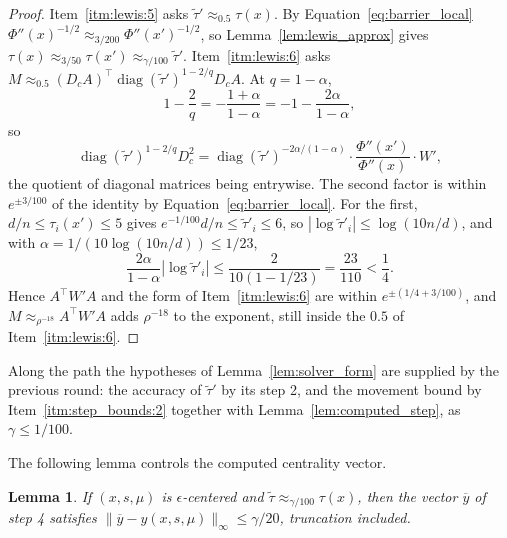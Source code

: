 \documentclass[11pt]{article}
\newtheorem{lemma}{Lemma}[section]
\newcommand{\diag}{\operatorname{diag}}
\newcommand{\tautil}{\widetilde{\tau}}
\begin{document}
\begin{proof}
Item~\ref{itm:lewis:5} asks $\tautil' \approx_{0.5} \tau(x)$.
By Equation~\eqref{eq:barrier_local}
$\Phi''(x)^{-1/2} \approx_{3/200} \Phi''(x')^{-1/2}$, so
Lemma~\ref{lem:lewis_approx} gives
$\tau(x) \approx_{3/50} \tau(x') \approx_{\gamma / 100} \tautil'$.
Item~\ref{itm:lewis:6} asks
$M \approx_{0.5} (D_c A)^\top \diag(\tautil')^{1 - 2/q} D_c A$.
At $q = 1 - \alpha$,
\[
1 - \frac{2}{q}
=
- \frac{1 + \alpha}{1 - \alpha}
=
-1 - \frac{2 \alpha}{1 - \alpha},
\]
so
\begin{equation}
\label{eq:solver_is_lewis_form}
\diag(\tautil')^{1 - 2/q} D_c^{2}
=
\diag(\tautil')^{-2 \alpha / (1 - \alpha)}
\cdot \frac{\Phi''(x')}{\Phi''(x)} \cdot W' ,
\end{equation}
the quotient of diagonal matrices being entrywise.
The second factor is within $e^{\pm 3/100}$ of the identity by
Equation~\eqref{eq:barrier_local}.
For the first, $d / n \le \tau_i(x') \le 5$ gives
$e^{-1/100} d / n \le \tautil'_i \le 6$, so
$|\log \tautil'_i| \le \log(10 n / d)$, and with
$\alpha = 1 / (10 \log(10 n / d)) \le 1/23$,
\[
\frac{2 \alpha}{1 - \alpha} \left| \log \tautil'_i \right|
\le
\frac{2}{10 (1 - 1/23)}
=
\frac{23}{110}
<
\frac{1}{4} .
\]
Hence $A^\top W' A$ and the form of Item~\ref{itm:lewis:6} are within
$e^{\pm (1/4 + 3/100)}$, and
$M \approx_{\rho^{-18}} A^\top W' A$ adds
$\rho^{-18}$ to the exponent, still inside the
$0.5$ of Item~\ref{itm:lewis:6}.
\end{proof}

Along the path the hypotheses of Lemma~\ref{lem:solver_form} are supplied by the
previous round: the accuracy of $\tautil'$ by its step 2, and the movement bound
by Item~\ref{itm:step_bounds:2} together with Lemma~\ref{lem:computed_step}, as
$\gamma \le 1/100$.

The following lemma controls the computed centrality vector.

\begin{lemma}
\label{lem:ybar}
If $(x, s, \mu)$ is
$\epsilon$-centered and
$\tautil \approx_{\gamma / 100} \tau(x)$, then the vector
$\overline{y}$ of step 4 satisfies
$\|\overline{y} - y(x, s, \mu)\|_{\infty} \le \gamma / 20$, truncation included.
\end{lemma}
\end{document}
